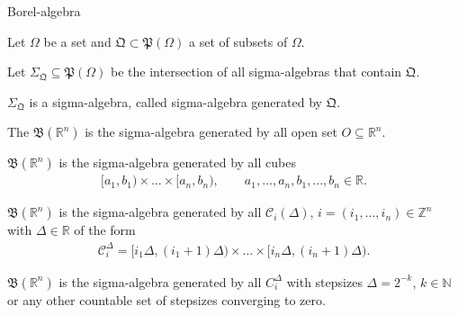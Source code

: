 \begin{frame}{Borel-algebra}
\bit
\item Let $\Omega$ be a set and $\mathfrak{Q}\subset\mathfrak{P}(\Omega)$ a set of subsets of $\Omega$. 
\item Let $\Sigma_{\mathfrak{Q}}\subseteq\mathfrak{P}(\Omega)$ be the intersection of all sigma-algebras that contain $\mathfrak{Q}$. 
\item $\Sigma_{\mathfrak{Q}}$ is a sigma-algebra, called sigma-algebra generated by $\mathfrak{Q}$. 
\eit 


\bit
\item[\iarrow] The  $\mathfrak{B}(\mathbb{R}^n)$ is the sigma-algebra generated by all open set $O\subseteq\mathbb{R}^n$.
\eit
\vspace{-0.4cm}
\bit
\item $\mathfrak{B}(\mathbb{R}^n)$ is the sigma-algebra generated by all cubes
\begin{align*}
[a_1,b_1)\times\dots\times[a_n,b_n),\qquad a_1,\dots,a_n,b_1,\dots,b_n\in\mathbb{R}.
\end{align*}
\item $\mathfrak{B}(\mathbb{R}^n)$ is the sigma-algebra generated by all  
$\mathcal{C}_i(\Delta)$, $i=(i_1,\dots,i_n)\in\mathbb{Z}^n$ with  $\Delta\in\mathbb{R}$ of the form
\begin{align}\label{UniQuantCells}
\mathcal{C}_i^{\Delta}= [i_1\Delta,(i_1+1)\Delta)\times\dots\times[i_n\Delta,(i_n+1)\Delta). 
\end{align}
\item $\mathfrak{B}(\mathbb{R}^n)$ is the sigma-algebra generated by all  $C_i^{\Delta}$ 
with  stepsizes $\Delta=2^{-k}$, $k\in\mathbb{N}$ or any other countable set of stepsizes converging to zero.  
\eit
\end{frame}



